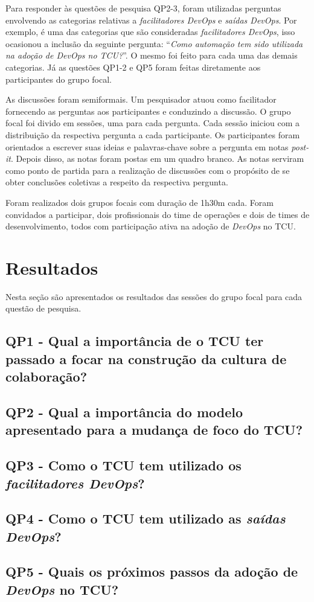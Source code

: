 Para responder às questões de pesquisa QP2-3, foram utilizadas perguntas
envolvendo as categorias relativas a \emph{facilitadores DevOps} e
\emph{saídas DevOps}. Por exemplo,  é uma das categorias que são
consideradas \emph{facilitadores DevOps}, isso ocasionou a inclusão da seguinte
pergunta: ``\textit{Como automação tem sido utilizada na adoção de
\textit{DevOps} no \acrshort{TCU}?}''. O mesmo foi feito para cada uma das
demais categorias. Já as questões QP1-2 e QP5 foram feitas diretamente aos
participantes do grupo focal.

As discussões foram semiformais. Um pesquisador atuou como facilitador
fornecendo as perguntas aos participantes e conduzindo a discussão.
O grupo focal foi divido em sessões, uma para cada pergunta. Cada sessão iniciou
com a distribuição da respectiva pergunta a cada participante. Os participantes
foram orientados a escrever suas ideias e palavras-chave sobre a pergunta em
notas \textit{post-it}. Depois disso, as notas foram postas em um quadro branco.
As notas serviram como ponto de partida para a realização de discussões com o
propósito de se obter conclusões coletivas a respeito da respectiva pergunta.

Foram realizados dois grupos focais com duração de 1h30m cada. Foram convidados
a participar, dois profissionais do time de operações e dois de times
de desenvolvimento, todos com participação ativa na adoção de \textit{DevOps}
no \acrshort{TCU}.

\section{Resultados}

Nesta seção são apresentados os resultados das sessões do grupo focal para cada
questão de pesquisa.

\subsection{QP1 - Qual a importância de o \acrshort{TCU} ter passado a focar na
construção da cultura de colaboração?}

\subsection{QP2 - Qual a importância do modelo apresentado para a mudança de
foco do \acrshort{TCU}?}

\subsection{QP3 - Como o \acrshort{TCU} tem utilizado os \emph{facilitadores
DevOps}?}

\subsection{QP4 - Como o \acrshort{TCU} tem utilizado as \emph{saídas
DevOps}?}

\subsection{QP5 - Quais os próximos passos da adoção de \textit{DevOps} no
\acrshort{TCU}?}
